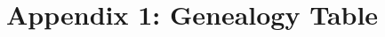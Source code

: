\documentclass[11pt]{article}
\begin{document}










\section{Appendix 1: Genealogy Table}
\end{document}
